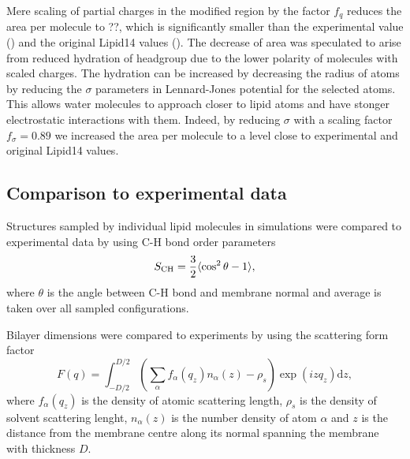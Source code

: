 \documentclass[aip,jcp,twocolumn]{revtex4}
\begin{document}
Mere scaling of partial charges in the modified region by the factor $f_q$ reduces the 
area per molecule to ??, which is significantly smaller than the
experimental value (\cite{}) and the original Lipid14 values (\cite{}).  
The decrease of area was speculated 
to arise from reduced hydration
of headgroup due to the lower polarity of molecules with scaled charges.
The hydration can be increased by decreasing the radius of atoms
by reducing the $\sigma$ parameters in Lennard-Jones potential for the selected atoms.
This allows water molecules to approach closer to lipid atoms and
have stonger electrostatic interactions with them.
Indeed, by reducing $\sigma$ with a scaling factor $f_\sigma = 0.89$ 
we increased the area per molecule
to a level close to experimental and original Lipid14 values. 


\subsection{Comparison to experimental data}
Structures sampled by individual lipid molecules in simulations were compared
to experimental data by using C-H bond order parameters \cite{ollila16}
\begin{equation}
S_{\rm CH}=\frac{3}{2}\langle \cos^2\theta -1 \rangle,
\end{equation}
where $\theta$ is the angle between C-H bond and membrane
normal and average is taken over all sampled configurations.

Bilayer dimensions were compared to experiments by using the
scattering form factor \cite{ollila16}
\begin{equation}
  F(q) = \int _{-D/2} ^{D/2} \left ( \sum _\alpha f_\alpha (q_z) n_\alpha (z) - \rho _s \right ) \exp (izq_z) \mathrm{d}z,
\end{equation}
where $f_\alpha(q_z)$ is the density of atomic scattering length, 
$\rho_s$ is the density of solvent scattering lenght,
$n_\alpha (z)$ is the number density of atom $\alpha$ and
$z$ is the distance from the membrane centre along its normal 
spanning the membrane with thickness $D$. 
\end{document}
